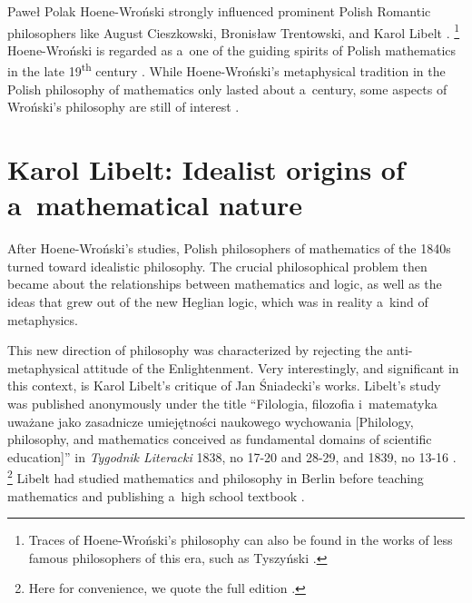 \begin{artengenv}{Paweł Polak}
Hoene-Wroński strongly influenced prominent Polish Romantic philosophers like August Cieszkowski, Bronisław Trentowski, and Karol Libelt
\parencite[e.g.][p.16]{wojcik_fenomen_2013}.%
\footnote{Traces of Hoene-Wroński's philosophy can also be found in the works of less famous philosophers of this era, such as Tyszyński 
\parencite*[][pp.81–82]{tyszynski_rozbiory_1854}.%
} Hoene-Wroński is regarded as a~one of the guiding spirits of Polish mathematics in the late 19\textsuperscript{th} century 
\parencite[cf.][p.15]{wojcik_fenomen_2013}. %
 While Hoene-Wroński's metaphysical tradition in the Polish philosophy of mathematics only lasted about a~century, some aspects of Wroński's philosophy are still of interest 
\parencites[][]{wagner_wronskis_2014}[][]{wagner_2012}.%


\section*{Karol Libelt: Idealist origins of a~mathematical nature }

After Hoene-Wroński's studies, Polish philosophers of mathematics of the 1840s turned toward idealistic philosophy. The crucial philosophical problem then became about the relationships between mathematics and logic, as well as the ideas that grew out of the new Heglian logic, which was in reality a~kind of metaphysics.

This new direction of philosophy was characterized by rejecting the anti-metaphysical attitude of the Enlightenment. Very interestingly, and significant in this context, is Karol Libelt's critique of Jan Śniadecki's works. Libelt's study was published anonymously under the title ``Filologia, filozofia i~matematyka uważane jako zasadnicze umiejętności naukowego wychowania [Philology, philosophy, and mathematics conceived as fundamental domains of scientific education]'' in \textit{Tygodnik Literacki} 1838, no 17-20 and 28-29, and 1839, no 13-16
\parencite[][full edition 1850]{libelt_filologia_1838}.%
\footnote{Here for convenience, we quote the full edition 
\parencite[][]{libelt_filologia_1850}.%
} Libelt had studied mathematics and philosophy in Berlin before teaching mathematics and publishing a~high school textbook 
\parencite[][]{libelt_wyklad_1844}.%



\end{artengenv}
